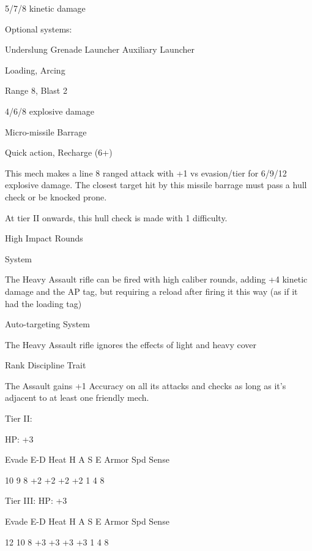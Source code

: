 5/7/8 kinetic damage
 

                                                                                                           


Optional systems:
 
Underslung Grenade Launcher  
Auxiliary Launcher
 
Loading, Arcing
 
Range 8, Blast 2
 
4/6/8 explosive damage
 

Micro-missile Barrage
 
Quick action, Recharge (6+)
 
This mech makes a line 8 ranged attack with +1 vs evasion/tier for 6/9/12 explosive damage. The  
closest target hit by this missile barrage must pass a hull check or be knocked prone.
 
At tier II onwards, this hull check is made with 1 difficulty.
 

High Impact Rounds
 
System
 
The Heavy Assault rifle can be fired with high caliber rounds, adding +4 kinetic damage and the  
AP tag, but requiring a reload after firing it this way (as if it had the loading tag)
 

Auto-targeting  
System
 
The Heavy Assault rifle ignores the effects of light and heavy cover
 

Rank Discipline  
Trait
 
The Assault gains +1 Accuracy on all its attacks and checks as long as it’s adjacent to at least  
one friendly mech.
 

Tier II:
 
HP: +3
 

          Evade    E-D    Heat     H    A     S     E       Armor        Spd      Sense 

          10       9      8        +2   +2    +2    +2      1            4        8 

Tier III:  
HP: +3
 

          Evade    E-D    Heat     H    A     S     E       Armor        Spd      Sense 

          12        10    8        +3   +3    +3    +3      1            4        8 

                                                                                                               

